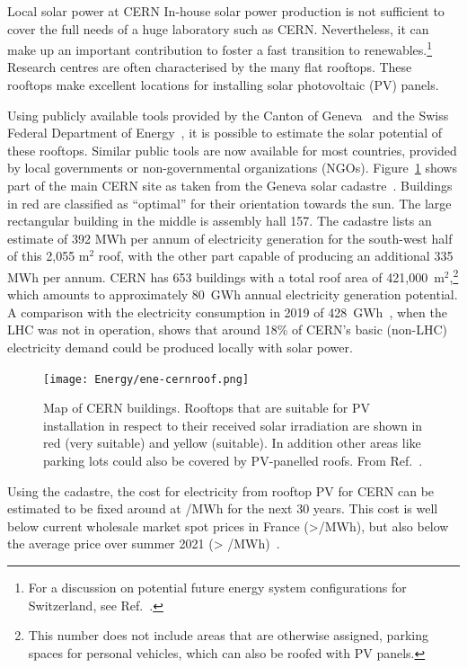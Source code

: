 \documentclass[../SustainableHEP.tex]{subfiles}
\begin{document}
\begin{casestudy}{Local solar power at CERN}%
    In-house solar power production is not sufficient to cover the full needs of a huge laboratory such as CERN. Nevertheless, it can make up an important contribution to foster a fast transition to renewables.\footnote{For a discussion on potential future energy system configurations for Switzerland, see Ref.~\cite{Zuettel}.} Research centres are often characterised by the many flat rooftops. These rooftops make excellent locations for installing solar photovoltaic (PV) panels. 

    Using publicly available tools provided by the Canton of Geneva~\cite{SIG} and the Swiss Federal Department of Energy~\cite{BFE}, it is possible to estimate the solar potential of these rooftops. Similar public tools are now available for most countries, provided by local governments or non-governmental organizations (NGOs). Figure~\ref{fig:ene-cernroof} shows part of the main CERN site as taken from the Geneva solar cadastre~\cite{SIG}. Buildings in red are classified as “optimal” for their orientation towards the sun. The large rectangular building in the middle is assembly hall 157. The cadastre lists an estimate of 392 MWh per annum of electricity generation for the south-west half of this 2,055 m$^2$ roof, with the other part capable of producing an additional 335 MWh per annum. CERN has 653 buildings with a total roof area of 421,000~m$^2$,\footnote{This number does not include areas that are otherwise assigned, \eg parking spaces for personal vehicles, which can also be roofed with PV panels.} which amounts to approximately 80~GWh annual electricity generation potential. A comparison with the electricity consumption in 2019 of 428~GWh~\cite{Environment:2737239}, when the LHC was not in operation, shows that around 18\% of CERN’s basic (non-LHC) electricity demand could be produced locally with solar power.\\

    \begin{figure}
    \captionsetup{type=figure}
    \texttt{[image: Energy/ene-cernroof.png]}
    \caption[CERN roofs suitable for solar cells]%
        {Map of CERN buildings. Rooftops that are suitable for PV installation in respect to their received solar irradiation are shown in red (very suitable) and yellow (suitable). In addition other areas like \eg parking lots could also be covered by PV-panelled roofs. From Ref.~\cite{SIG}.\label{fig:ene-cernroof}}
    \end{figure}

    Using the cadastre, the cost for electricity from rooftop PV for CERN can be estimated to be fixed around at /MWh for the next 30 years. This cost is well below current wholesale market spot prices in France (>/MWh), but also below the average price over summer 2021 (> /MWh)~\cite{FranceMix}.
\end{casestudy}
\end{document}
